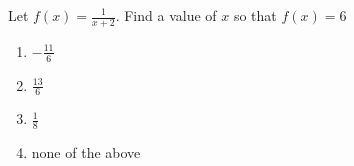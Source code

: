 \bigskip

\item  Let $f(x)=\frac{1}{x+2}$.  Find a value of $x$ so that $f(x)=6$

\begin{enumerate}
\item $-\frac{11}{6}$
\item $\frac{13}{6}$
\item $\frac{1}{8}$
\item none of the above
\end{enumerate}

